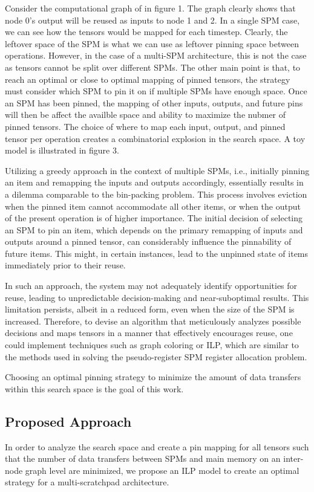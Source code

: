 Consider the computational graph of in figure 1. The graph clearly shows that
node 0's output will be reused as inputs to node 1 and 2. In a single SPM case,
we can see how the tensors would be mapped for each timestep. Clearly, the leftover
space of the SPM is what we can use as leftover pinning space between operations.
However, in the case of a multi-SPM architecture, this is not the case as tensors
cannot be split over different SPMs. The other main point is that, to reach an optimal
or close to optimal mapping of pinned tensors, the strategy must consider which SPM
to pin it on if multiple SPMs have enough space. Once an SPM has been pinned, the
mapping of other inputs, outputs, and future pins will then be affect the availble
space and ability to maximize the nubmer of pinned tensors. The choice of where to
map each input, output, and pinned tensor per operation creates a combinatorial
explosion in the search space. A toy model is illustrated in figure 3.

Utilizing a greedy approach in the context of multiple SPMs, i.e., initially
pinning an item and remapping the inputs and outputs accordingly, essentially
results in a dilemma comparable to the bin-packing problem. This process
involves eviction when the pinned item cannot accommodate all other items, or
when the output of the present operation is of higher importance. The initial
decision of selecting an SPM to pin an item, which depends on the primary
remapping of inputs and outputs around a pinned tensor, can considerably
influence the pinnability of future items. This might, in certain instances,
lead to the unpinned state of items immediately prior to their reuse.

In such an approach, the system may not adequately identify opportunities for
reuse, leading to unpredictable decision-making and near-suboptimal results.
This limitation persists, albeit in a reduced form, even when the size of the
SPM is increased. Therefore, to devise an algorithm that meticulously analyzes
possible decisions and maps tensors in a manner that effectively encourages
reuse, one could implement techniques such as graph coloring or ILP, which are
similar to the methods used in solving the pseudo-register SPM register
allocation problem.

Choosing an optimal pinning strategy to minimize the amount of data transfers
within this search space is the goal of this work.

\subsection{Proposed Approach}
In order to analyze the search space and create a pin mapping for all tensors
such that the number of data transfers between SPMs and main memory on an
inter-node graph level are minimized, we propose an ILP model to create an
optimal strategy for a multi-scratchpad architecture.

